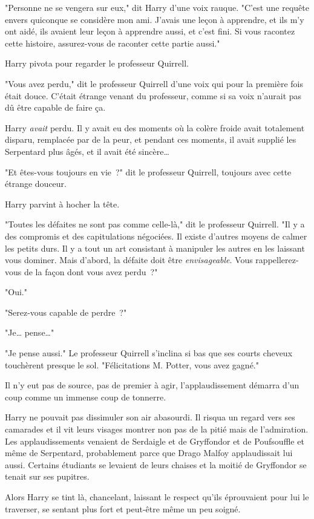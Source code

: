 "Personne ne se vengera sur eux," dit Harry d'une voix rauque. "C'est une requête envers quiconque se considère mon ami. J'avais une leçon à apprendre, et ils m'y ont aidé, ils avaient leur leçon à apprendre aussi, et c'est fini. Si vous racontez cette histoire, assurez-vous de raconter cette partie aussi."

Harry pivota pour regarder le professeur Quirrell.

"Vous avez perdu," dit le professeur Quirrell d'une voix qui pour la première fois était douce. C'était étrange venant du professeur, comme si sa voix n'aurait pas dû être capable de faire ça.

Harry \emph{avait} perdu. Il y avait eu des moments où la colère froide avait totalement disparu, remplacée par de la peur, et pendant ces moments, il avait supplié les Serpentard plus âgés, et il avait été sincère…

"Et êtes-vous toujours en vie~?" dit le professeur Quirrell, toujours avec cette étrange douceur.

Harry parvint à hocher la tête.

"Toutes les défaites ne sont pas comme celle-là," dit le professeur Quirrell. "Il y a des compromis et des capitulations négociées. Il existe d'autres moyens de calmer les petits durs. Il y a tout un art consistant à manipuler les autres en les laissant vous dominer. Mais d'abord, la défaite doit être \emph{envisageable}. Vous rappellerez-vous de la façon dont vous avez perdu~?"

"Oui."

"Serez-vous capable de perdre~?"

"Je… pense…"

"Je pense aussi." Le professeur Quirrell s'inclina si bas que ses courts cheveux touchèrent presque le sol. "Félicitations M. Potter, vous avez gagné."

Il n'y eut pas de source, pas de premier à agir, l'applaudissement démarra d'un coup comme un immense coup de tonnerre.

Harry ne pouvait pas dissimuler son air abasourdi. Il risqua un regard vers ses camarades et il vit leurs visages montrer non pas de la pitié mais de l'admiration. Les applaudissements venaient de Serdaigle et de Gryffondor et de Poufsouffle et même de Serpentard, probablement parce que Drago Malfoy applaudissait lui aussi. Certains étudiants se levaient de leurs chaises et la moitié de Gryffondor se tenait sur ses pupitres.

Alors Harry se tint là, chancelant, laissant le respect qu'ils éprouvaient pour lui le traverser, se sentant plus fort et peut-être même un peu soigné.

